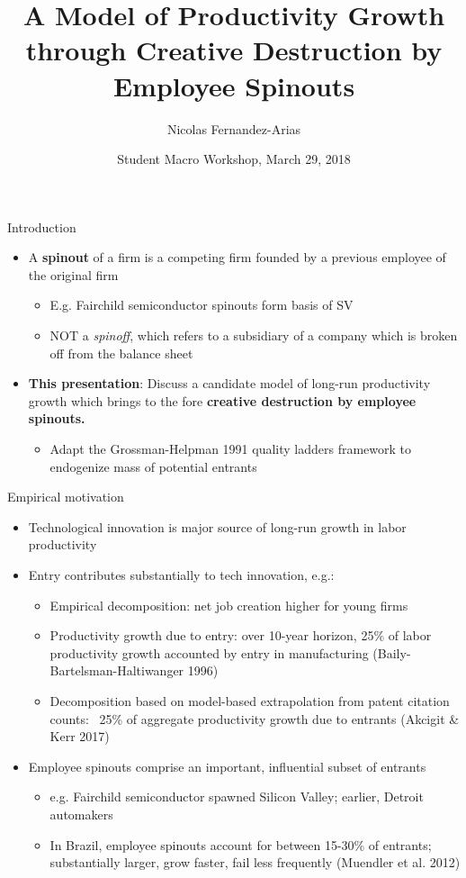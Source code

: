 \documentclass[english,usenames,dvipsnames]{beamer}
\title{A Model of Productivity Growth through Creative Destruction by Employee Spinouts}
\author{Nicolas Fernandez-Arias}
\date[Mar 29 2017]{Student Macro Workshop, March 29, 2018}
\begin{document}
	
\frame{\titlepage}

\begin{frame}{Introduction}
\label{Introduction}
\begin{itemize}
	\item A \textbf{spinout} of a firm is a competing firm founded by a previous employee of the original firm
	\begin{itemize}
		\item E.g. Fairchild semiconductor spinouts form basis of SV \hyperlink{fairchild_spinouts}{}
		\item NOT a \emph{spinoff}, which refers to a subsidiary of a company which is broken off from the balance sheet
	\end{itemize}
	\item \textbf{This presentation}: Discuss a candidate model of long-run productivity growth which brings to the fore \textbf{creative destruction by employee spinouts.}
	\begin{itemize}
		\item Adapt the Grossman-Helpman 1991 quality ladders framework to endogenize mass of potential entrants
	\end{itemize}
\end{itemize}
\end{frame}

\begin{frame}{Empirical motivation}
\label{Motivation1}
\begin{itemize}
	\item Technological innovation is major source of long-run growth in labor productivity
	\item Entry contributes substantially to tech innovation, e.g.:
	\begin{itemize}
	\item Empirical decomposition: net job creation higher for young firms
	\item Productivity growth due to entry: over 10-year horizon, 25\% of labor productivity growth accounted by entry in manufacturing (Baily-Bartelsman-Haltiwanger 1996)
	\item Decomposition based on model-based extrapolation from patent citation counts: ~25\% of aggregate productivity growth due to entrants (Akcigit \& Kerr 2017)
	\end{itemize}
	\item Employee spinouts comprise an important, influential subset of entrants
	\begin{itemize}
		\item e.g. Fairchild semiconductor spawned Silicon Valley; earlier, Detroit automakers
		\item In Brazil, employee spinouts account for between 15-30\% of entrants; substantially larger, grow faster, fail less frequently (Muendler et al. 2012)
	\end{itemize}
\end{itemize}
\end{frame}
\end{document}
